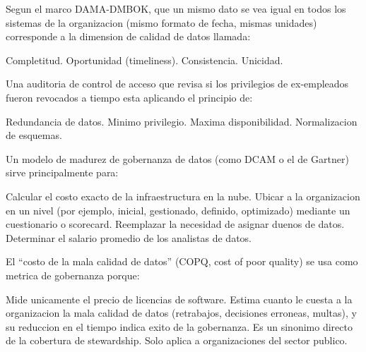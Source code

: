 \documentclass[12pt,addpoints]{exam}
\begin{document}
\begin{questions}
\question[1] Segun el marco DAMA-DMBOK, que un mismo dato se vea igual en
todos los sistemas de la organizacion (mismo formato de fecha, mismas
unidades) corresponde a la dimension de calidad de datos llamada:
\begin{choices}
  \choice Completitud.
  \choice Oportunidad (timeliness).
  \CorrectChoice Consistencia.
  \choice Unicidad.
\end{choices}

\question[1] Una auditoria de control de acceso que revisa si los
privilegios de ex-empleados fueron revocados a tiempo esta aplicando el
principio de:
\begin{choices}
  \choice Redundancia de datos.
  \CorrectChoice Minimo privilegio.
  \choice Maxima disponibilidad.
  \choice Normalizacion de esquemas.
\end{choices}

\question[1] Un modelo de madurez de gobernanza de datos (como DCAM o el de
Gartner) sirve principalmente para:
\begin{choices}
  \choice Calcular el costo exacto de la infraestructura en la nube.
  \CorrectChoice Ubicar a la organizacion en un nivel (por ejemplo, inicial,
    gestionado, definido, optimizado) mediante un cuestionario o scorecard.
  \choice Reemplazar la necesidad de asignar duenos de datos.
  \choice Determinar el salario promedio de los analistas de datos.
\end{choices}

\question[1] El ``costo de la mala calidad de datos'' (COPQ, cost of poor
quality) se usa como metrica de gobernanza porque:
\begin{choices}
  \choice Mide unicamente el precio de licencias de software.
  \CorrectChoice Estima cuanto le cuesta a la organizacion la mala calidad
    de datos (retrabajos, decisiones erroneas, multas), y su reduccion en
    el tiempo indica exito de la gobernanza.
  \choice Es un sinonimo directo de la cobertura de stewardship.
  \choice Solo aplica a organizaciones del sector publico.
\end{choices}

\end{questions}
\end{document}
